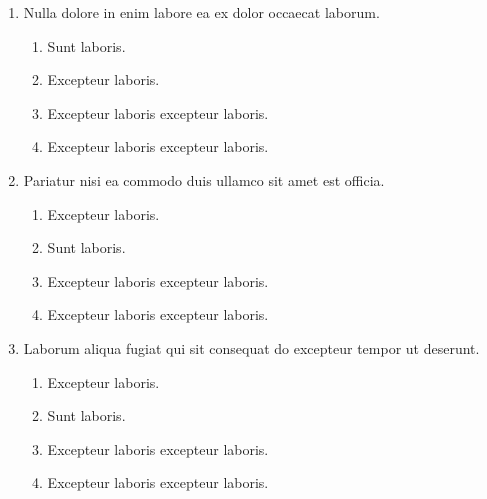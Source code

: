 \documentclass[a4paper,12pt]{article}
\begin{document}
\begin{enumerate}[label=\textbf{\arabic*.}]
\begin{multicols}{2}
\begin{enumerate}
	\end{enumerate}

\end{multicols}
\item Nulla dolore in enim labore ea ex dolor occaecat laborum.
\begin{multicols}{2}
	\begin{enumerate}
		\item  Sunt laboris.
    
		\item  Excepteur laboris.
    
		\item  Excepteur laboris excepteur laboris.
    
		\item  Excepteur laboris excepteur laboris.
  
	\end{enumerate}

\end{multicols}
\item Pariatur nisi ea commodo duis ullamco sit amet est officia.
\begin{multicols}{2}
	\begin{enumerate}
		\item  Excepteur laboris.
    
		\item  Sunt laboris.
    
		\item  Excepteur laboris excepteur laboris.
  
		\item  Excepteur laboris excepteur laboris.
    
	\end{enumerate}

\end{multicols}
\item Laborum aliqua fugiat qui sit consequat do excepteur tempor ut deserunt.
\begin{multicols}{2}
	\begin{enumerate}
		\item  Excepteur laboris.
    
		\item  Sunt laboris.
    
		\item  Excepteur laboris excepteur laboris.
  
		\item  Excepteur laboris excepteur laboris.
    
	\end{enumerate}


\end{multicols}
\end{enumerate}
\end{document}
